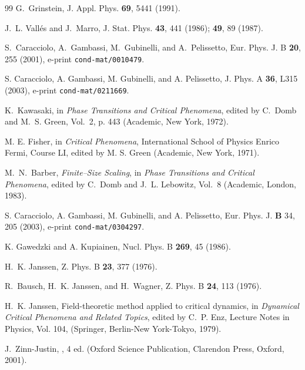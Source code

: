 \documentclass[12pt]{article}
\begin{document}
\begin{thebibliography}{99}
G.~Grinstein,
\newblock J. Appl. Phys. {\bf 69}, 5441 (1991).

J.~L. Vall\'es and J.~Marro,
\newblock J. Stat. Phys. {\bf 43}, 441 (1986);
{\bf 49}, 89 (1987).

S.~Caracciolo, A.~Gambassi, M.~Gubinelli, and A.~Pelissetto,
Eur. Phys. J.  B {\bf 20}, 255 (2001),
e-print {\tt cond-mat/0010479}.

S. Caracciolo, A. Gambassi, M. Gubinelli, and A. Pelissetto,
J. Phys. A {\bf 36}, L315 (2003), e-print {\tt cond-mat/0211669}.

K.~Kawasaki,
in {\em Phase Transitions and Critical Phenomena}, edited by C.~Domb
  and M.~S. Green, Vol.~2, p. 443 (Academic, New York, 1972).

M. E. Fisher, in {\em Critical Phenomena}, International School
of Physics Enrico Fermi, Course LI, edited by M. S. Green
(Academic, New York, 1971).
 
M.~N.~Barber,
{\it Finite--Size Scaling},
 in {\em Phase Transitions and Critical Phenomena}, edited by C.~Domb
  and J.~L. Lebowitz, Vol.~8 (Academic, London, 1983). 

S. Caracciolo, A. Gambassi, M. Gubinelli, and A. Pelissetto,
Eur. Phys. J. {\bf B} 34, 205 (2003), 
e-print {\tt cond-mat/0304297}.

K. Gawedzki and A. Kupiainen,
Nucl. Phys. B {\bf 269}, 45 (1986).

H.~K. Janssen,
Z. Phys. B {\bf 23}, 377 (1976).

R.~Bausch, H.~K. Janssen, and H.~Wagner,
Z. Phys. B {\bf 24}, 113 (1976).

H.~K. Janssen,
Field-theoretic method applied to critical dynamics,
in {\em Dynamical Critical Phenomena and Related Topics}, edited by
  C.~P. Enz, Lecture Notes in Physics, Vol. 104, (Springer,
  Berlin-New York-Tokyo, 1979).

J.~Zinn-Justin,
, 4 ed. (Oxford
  Science Publication, Clarendon Press, Oxford, 2001).


\end{thebibliography}
\end{document}
